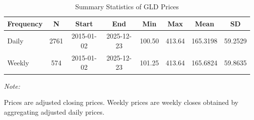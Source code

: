 \begin{table}[!h]
\centering
\caption{\label{tab:tab:prices}Summary Statistics of GLD Prices}
\centering
\begin{threeparttable}
\begin{tabular}[t]{lccccccc}
\toprule
Frequency & N & Start & End & Min & Max & Mean & SD\\
\midrule
Daily & 2761 & 2015-01-02 & 2025-12-23 & 100.50 & 413.64 & 165.3198 & 59.2529\\
Weekly & 574 & 2015-01-02 & 2025-12-23 & 101.25 & 413.64 & 165.6824 & 59.8635\\
\bottomrule
\end{tabular}
\begin{tablenotes}
\item \textit{Note: } 
\item Prices are adjusted closing prices. Weekly prices are weekly closes obtained by aggregating adjusted daily prices.
\end{tablenotes}
\end{threeparttable}
\end{table}
